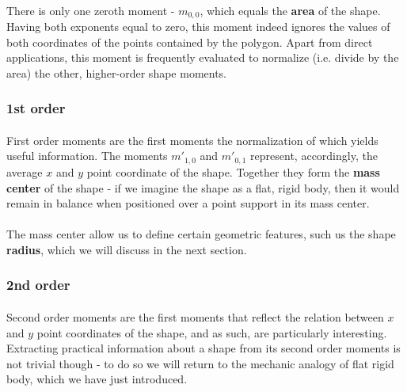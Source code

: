 \paragraph*{}
There is only one zeroth moment - $m_{0,0}$, which equals the \textbf{area} of the shape. Having both exponents equal to zero, this moment indeed ignores the values of both coordinates of the points contained by the polygon. Apart from direct applications, this moment is frequently evaluated to normalize (i.e. divide by the area) the other, higher-order shape moments.

\subsubsection{1st order}

\paragraph*{}
First order moments are the first moments the normalization of which yields useful information. The moments $m'_{1,0}$ and $m'_{0,1}$ represent, accordingly, the average $x$ and $y$ point coordinate of the shape. Together they form the \textbf{mass center} of the shape -  if we imagine the shape as a flat, rigid body, then it would remain in balance when positioned over a point support in its mass center.

\paragraph*{}
The mass center allow us to define certain geometric features, such us the shape \textbf{radius}, which we will discuss in the next section.

\subsubsection{2nd order} 

\paragraph*{}
Second order moments are the first moments that reflect the relation between $x$ and $y$ point coordinates of the shape, and as such, are particularly interesting. Extracting practical information about a shape from its second order moments is not trivial though - to do so we will return to the mechanic analogy of flat rigid body, which we have just introduced.

